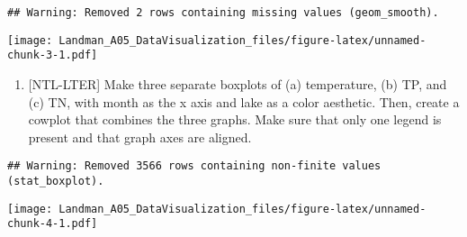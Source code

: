 \documentclass[]{article}
\newenvironment{Shaded}{\begin{snugshade}}{\end{snugshade}}
\newcommand{\DataTypeTok}[1]{\textcolor[rgb]{0.13,0.29,0.53}{#1}}
\newcommand{\KeywordTok}[1]{\textcolor[rgb]{0.13,0.29,0.53}{\textbf{#1}}}
\newcommand{\NormalTok}[1]{#1}
\newcommand{\OperatorTok}[1]{\textcolor[rgb]{0.81,0.36,0.00}{\textbf{#1}}}
\newcommand{\StringTok}[1]{\textcolor[rgb]{0.31,0.60,0.02}{#1}}
\providecommand{\tightlist}{%
  \setlength{\itemsep}{0pt}\setlength{\parskip}{0pt}}
\begin{document}
\begin{verbatim}
## Warning: Removed 2 rows containing missing values (geom_smooth).
\end{verbatim}

\texttt{[image: Landman\_A05\_DataVisualization\_files/figure-latex/unnamed-chunk-3-1.pdf]}

\begin{enumerate}
\def\labelenumi{\arabic{enumi}.}
\setcounter{enumi}{4}
\tightlist
\item
  {[}NTL-LTER{]} Make three separate boxplots of (a) temperature, (b)
  TP, and (c) TN, with month as the x axis and lake as a color
  aesthetic. Then, create a cowplot that combines the three graphs. Make
  sure that only one legend is present and that graph axes are aligned.
\end{enumerate}

\begin{Shaded}
\end{Shaded}

\begin{verbatim}
## Warning: Removed 3566 rows containing non-finite values (stat_boxplot).
\end{verbatim}

\texttt{[image: Landman\_A05\_DataVisualization\_files/figure-latex/unnamed-chunk-4-1.pdf]}
\end{document}
